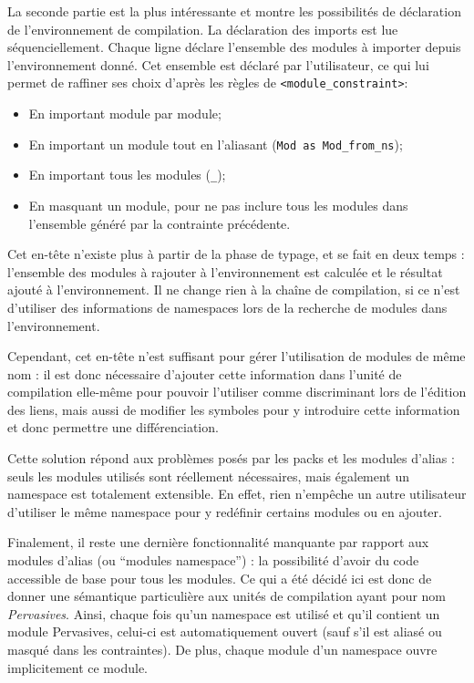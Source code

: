 \documentclass[11pt,a4paper]{report}
\begin{document}
La seconde partie est la plus intéressante et montre les possibilités de
déclaration de l'environnement de compilation. La déclaration des imports est
lue séquenciellement. Chaque ligne déclare l'ensemble des modules à importer
depuis l'environnement donné. Cet ensemble est déclaré par l'utilisateur, ce qui
lui permet de raffiner ses choix d'après les règles de \texttt{<module_constraint>}:
\begin{itemize}
\item En important module par module;
\item En important un module tout en l'aliasant (\lstinline{Mod as Mod_from_ns});
\item En important tous les modules (\texttt{\_});
\item En masquant un module, pour ne pas inclure tous les modules dans
  l'ensemble généré par la contrainte précédente.
\end{itemize}

Cet en-tête n'existe plus à partir de la phase de typage, et se fait en deux
temps : l'ensemble des modules à rajouter à l'environnement est calculée et le
résultat ajouté à l'environnement. Il ne change rien à la chaîne de compilation,
si ce n'est d'utiliser des informations de namespaces lors de la recherche de
modules dans l'environnement.

Cependant, cet en-tête n'est suffisant pour gérer l'utilisation de modules de
même nom : il est donc nécessaire d'ajouter cette information dans l'unité de
compilation elle-même pour pouvoir l'utiliser comme discriminant lors de
l'édition des liens, mais aussi de modifier les symboles pour y introduire cette
information et donc permettre une différenciation.

Cette solution répond aux problèmes posés par les packs et les modules d'alias :
seuls les modules utilisés sont réellement nécessaires, mais également un
namespace est totalement extensible. En effet, rien n'empêche un autre
utilisateur d'utiliser le même namespace pour y redéfinir certains modules ou en
ajouter.

Finalement, il reste une dernière fonctionnalité manquante par rapport aux
modules d'alias (ou ``modules namespace'') : la possibilité d'avoir du code
accessible de base pour tous les modules. Ce qui a été décidé ici est donc de
donner une sémantique particulière aux unités de compilation ayant pour nom
\emph{Pervasives}. Ainsi, chaque fois qu'un namespace est utilisé et qu'il
contient un module Pervasives, celui-ci est automatiquement ouvert (sauf s'il
est aliasé ou masqué dans les contraintes). De plus, chaque module d'un
namespace ouvre implicitement ce module.
\end{document}
